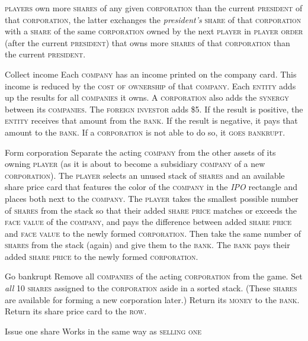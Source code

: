 \documentclass[11pt,a4paper]{article}
\newenvironment{my_description}
  {\begin{list}{}{\setlength{\labelwidth}{0pt}
   \leftmargin=1.2em
   \setlength{\itemindent}{-\leftmargin}
   \renewcommand{\makelabel}{\descriptionlabel}}
  \setlength{\itemsep}{1pt}
  \setlength{\parskip}{0pt}
  \setlength{\parsep}{0pt}
  }
  {\end{list}}
\begin{document}
\begin{multicols}{2}
{\begin{my_description}
  \textsc{players} own more \textsc{shares} of any given
  \textsc{corporation} than the current \textsc{president} of that
  \textsc{corporation}, the latter exchanges the \emph{president's}
  \textsc{share} of that \textsc{corporation} with a \textsc{share} of
  the same \textsc{corporation} owned by the next \textsc{player} in
  \textsc{player order} (after the current \textsc{president})
  that owns more \textsc{shares} of that \textsc{corporation} than
  the current \textsc{president}.
\item[Collect income] Each \textsc{company} has an income printed on
  the company card. This income is reduced by the \textsc{cost of
    ownership} of that \textsc{company}. Each \textsc{entity} adds up
  the results for all \textsc{companies} it owns. A
  \textsc{corporation} also adds the \textsc{synergy} between its
  \textsc{companies}. The \textsc{foreign investor} adds \$5. If the
  result is positive, the \textsc{entity} receives that amount from
  the \textsc{bank}. If the result is negative, it pays that amount to
  the \textsc{bank}. If a \textsc{corporation} is not able to do so,
  it \textsc{goes bankrupt}.
\item[Form corporation] Separate the acting \textsc{company} from the
  other assets of its owning \textsc{player} (as it is about to become
  a subsidiary \textsc{company} of a new \textsc{corporation}). The
  \textsc{player} selects an unused stack of \textsc{shares} and an
  available share price card that features the color of the
  \textsc{company} in the \emph{IPO} rectangle and places both next to
  the \textsc{company}. The \textsc{player} takes the smallest
  possible number of \textsc{shares} from the stack so that their
  added \textsc{share price} matches or exceeds the \textsc{face
    value} of the \textsc{company}, and pays the difference between
  added \textsc{share price} and \textsc{face value} to the newly
  formed \textsc{corporation}. Then take the same number of
  \textsc{shares} from the stack (again) and give them to the
  \textsc{bank}. The \textsc{bank} pays their added \textsc{share
    price} to the newly formed \textsc{corporation}.
\item[Go bankrupt] Remove all \textsc{companies} of the acting
  \textsc{corporation} from the game. Set \emph{all} 10
  \textsc{shares} assigned to the \textsc{corporation} aside in a
  sorted stack. (These \textsc{shares} are available for forming a new
  corporation later.) Return its \textsc{money} to the \textsc{bank}. Return
  its share price card to the \textsc{row}.
\item[Issue one share] Works in the same way as \textsc{selling one
}
\end{my_description}}
\end{multicols}
\end{document}
